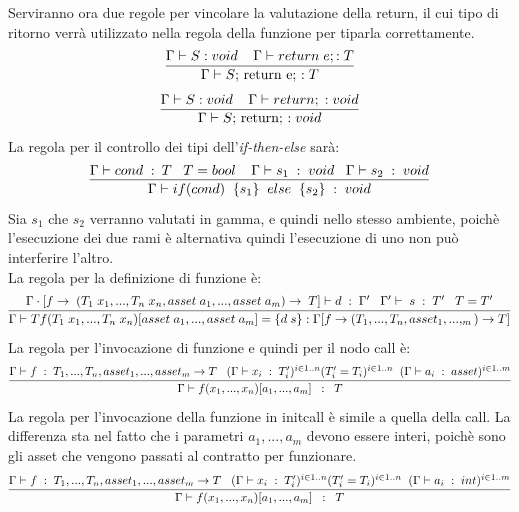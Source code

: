 \documentclass[12pt, a4paper]{report}
\begin{document}
Serviranno ora due regole per vincolare la valutazione della return, il cui tipo di ritorno verrà utilizzato nella regola della funzione per tiparla correttamente.
\[\infer{\Gamma \vdash S\mbox{; return e; :\;} T}{\Gamma \vdash S: void \;\;\;\; \Gamma \vdash return \; e; : T}\]
\[\infer{\Gamma \vdash S\mbox{; return; :\;} void}{\Gamma \vdash S: void \;\;\;\; \Gamma \vdash return; \; : void}\]
La regola per il controllo dei tipi dell'\emph{if-then-else} sarà:
\[
    \infer{\Gamma \vdash if (cond)\;\; \{s_1\} \;\;else\;\; \{s_2\} \; : \; void}{\Gamma \vdash cond \;:\:T\;\;\; T=bool\;\;\;\; \Gamma\vdash s_1 \;:\;void\;\;\; \Gamma\vdash s_2\;: \;void}
    \]
Sia $s_1$ che $s_2$ verranno valutati in gamma, e quindi nello stesso ambiente, poichè l'esecuzione dei due rami è alternativa quindi l'esecuzione di uno non può interferire l'altro.\\
La regola per la definizione di funzione è:
\[
    \infer{\Gamma \vdash T f(T_1\;x_1,...,T_n\;x_n)[asset\;a_1,...,asset\;a_m] = \{d\;s\}:\Gamma[f\rightarrow(T_1,...,T_n,asset_1,...,_m)\rightarrow T]}
    {\Gamma\cdot[f\rightarrow\;(T_1\;x_1,...,T_n\;x_n,asset\;a_1,...,asset\;a_m)\rightarrow\;T] \vdash d\;:\;\Gamma' \;\;\; \Gamma'\vdash\;s\;:\; T'\;\;\; T=T' }
    \]
La regola per l'invocazione di funzione e quindi per il nodo call è:
\[
\infer{\Gamma\vdash f(x_1,...,x_n)[a_1,...,a_m] \;\;:\;\; T}{\Gamma \vdash f\;:\;T_1,...,T_n,asset_1,...,asset_m \rightarrow T\;\;\;(\Gamma \vdash x_i\;:\; T_i')^{i\in 1..n} (T_i' = T_i)^{i\in 1..n}\;\; (\Gamma \vdash a_i\;:\;asset)^{i\in 1..m}}    
\]
La regola per l'invocazione della funzione in initcall è simile a quella della call. La differenza sta nel fatto che i parametri $a_1,...,a_m$ devono essere interi, poichè sono gli asset che vengono passati al contratto per funzionare.
\[
\infer{\Gamma\vdash f(x_1,...,x_n)[a_1,...,a_m] \;\;:\;\; T}{\Gamma \vdash f\;:\;T_1,...,T_n,asset_1,...,asset_m \rightarrow T\;\;\;(\Gamma \vdash x_i\;:\; T_i')^{i\in 1..n} (T_i' = T_i)^{i\in 1..n}\;\; (\Gamma \vdash a_i\;:\;int)^{i\in 1..m}}    
\]
\end{document}
